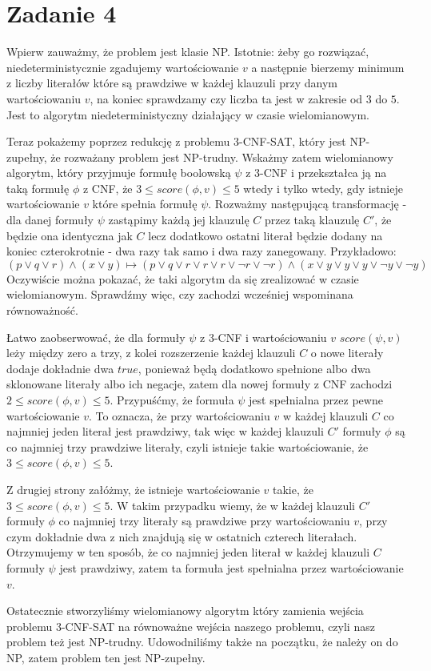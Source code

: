 \documentclass{article}
\author{Hubert Michalski}
\begin{document}
\Large
\maketitle

\section{Zadanie 4}

Wpierw zauważmy, że problem jest klasie NP. Istotnie: żeby go rozwiązać, niedeterministycznie zgadujemy wartościowanie $v$ a następnie bierzemy minimum z liczby literałów które są prawdziwe w każdej klauzuli przy danym wartościowaniu $v$, na koniec sprawdzamy czy liczba ta jest w zakresie od $3$ do $5$. Jest to algorytm niedeterministyczny działający w czasie wielomianowym.

Teraz pokażemy poprzez redukcję z problemu 3-CNF-SAT, który jest NP-zupełny, że rozważany problem jest NP-trudny. Wskażmy zatem wielomianowy algorytm, który przyjmuje formułę boolowską $\psi$ z 3-CNF i przekształca ją na taką formułę $\phi$ z CNF, że $3\leq score(\phi,v) \leq 5$ wtedy i tylko wtedy, gdy istnieje wartościowanie $v$ które spełnia formułę $\psi$. Rozważmy następującą transformację - dla danej formuły $\psi$ zastąpimy każdą jej klauzulę $C$ przez taką klauzulę $C'$, że będzie ona identyczna jak $C$ lecz dodatkowo ostatni literał będzie dodany na koniec czterokrotnie - dwa razy tak samo i dwa razy zanegowany.
Przykładowo:
$$
(p\lor q \lor r) \land (x\lor y) \mapsto
(p\lor q \lor r \lor r \lor r \lor \neg r \lor \neg r) \land (x\lor y \lor y \lor y \lor \neg y \lor \neg y)
$$
Oczywiście można pokazać, że taki algorytm da się zrealizować w czasie wielomianowym. Sprawdźmy więc, czy zachodzi wcześniej wspominana równoważność.

Łatwo zaobserwować, że dla formuły $\psi$ z 3-CNF i wartościowaniu $v$ $score(\psi, v)$ leży między zero a trzy, z kolei rozszerzenie każdej klauzuli $C$ o nowe literały dodaje dokładnie dwa $true$, ponieważ będą dodatkowo spełnione albo dwa sklonowane literały albo ich negacje, zatem dla nowej formuły z CNF zachodzi $2\leq score(\phi, v) \leq 5$. Przypuśćmy, że formuła $\psi$ jest spełnialna przez pewne wartościowanie $v$. To oznacza, że przy wartościowaniu $v$ w każdej klauzuli $C$ co najmniej jeden literał jest prawdziwy, tak więc w każdej klauzuli $C'$ formuły $\phi$ są co najmniej trzy prawdziwe literały, czyli istnieje takie wartościowanie, że $3\leq score(\phi, v) \leq 5$.
\newpage

Z drugiej strony załóżmy, że istnieje wartościowanie $v$ takie, że\break $3 \leq score(\phi,v) \leq 5$. W takim przypadku wiemy, że w każdej klauzuli $C'$ formuły $\phi$ co najmniej trzy literały są prawdziwe przy wartościowaniu $v$, przy czym dokładnie dwa z nich znajdują się w ostatnich czterech literałach. Otrzymujemy w ten sposób, że co najmniej jeden literał w każdej klauzuli $C$ formuły $\psi$ jest prawdziwy, zatem ta formuła jest spełnialna przez wartościowanie $v$.

Ostatecznie stworzyliśmy wielomianowy algorytm który zamienia wejścia problemu 3-CNF-SAT na równoważne wejścia naszego problemu, czyli nasz problem też jest NP-trudny. Udowodniliśmy także na początku, że należy on do NP, zatem problem ten jest NP-zupełny.
\end{document}
